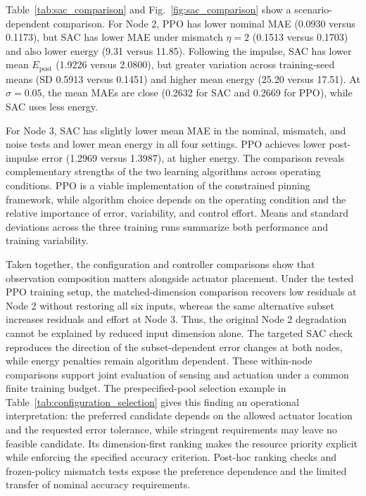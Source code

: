 \documentclass[a4paper,fleqn]{cas-sc}
\theoremstyle{plain}
\theoremstyle{definition}
\begin{document}
Table~\ref{tab:sac_comparison} and Fig.~\ref{fig:sac_comparison} show a scenario-dependent comparison. For Node 2, PPO has lower nominal MAE (0.0930 versus 0.1173), but SAC has lower MAE under mismatch $\eta=2$ (0.1513 versus 0.1703) and also lower energy (9.31 versus 11.85). Following the impulse, SAC has lower mean $E_{\mathrm{post}}$ (1.9226 versus 2.0800), but greater variation across training-seed means (SD 0.5913 versus 0.1451) and higher mean energy (25.20 versus 17.51). At $\sigma=0.05$, the mean MAEs are close (0.2632 for SAC and 0.2669 for PPO), while SAC uses less energy.

For Node 3, SAC has slightly lower mean MAE in the nominal, mismatch, and noise tests and lower mean energy in all four settings. PPO achieves lower post-impulse error (1.2969 versus 1.3987), at higher energy. The comparison reveals complementary strengths of the two learning algorithms across operating conditions. PPO is a viable implementation of the constrained pinning framework, while algorithm choice depends on the operating condition and the relative importance of error, variability, and control effort. Means and standard deviations across the three training runs summarize both performance and training variability.

Taken together, the configuration and controller comparisons show that observation composition matters alongside actuator placement. Under the tested PPO training setup, the matched-dimension comparison recovers low residuals at Node 2 without restoring all six inputs, whereas the same alternative subset increases residuals and effort at Node 3. Thus, the original Node 2 degradation cannot be explained by reduced input dimension alone. The targeted SAC check reproduces the direction of the subset-dependent error changes at both nodes, while energy penalties remain algorithm dependent. These within-node comparisons support joint evaluation of sensing and actuation under a common finite training budget. The prespecified-pool selection example in Table~\ref{tab:configuration_selection} gives this finding an operational interpretation: the preferred candidate depends on the allowed actuator location and the requested error tolerance, while stringent requirements may leave no feasible candidate. Its dimension-first ranking makes the resource priority explicit while enforcing the specified accuracy criterion. Post-hoc ranking checks and frozen-policy mismatch tests expose the preference dependence and the limited transfer of nominal accuracy requirements.
\end{document}
